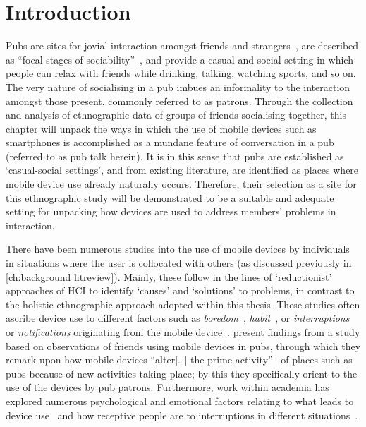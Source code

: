 \section{Introduction}\label{sec:empirical pub intro}
\begin{revisedsubmission}
Pubs are sites for jovial interaction amongst friends and strangers~\citep{Fox1996}, are described as ``focal stages of sociability''~\citep[p. 25]{Torronen2005}, and provide a casual and social setting in which people can relax with friends while drinking, talking, watching sports, and so on.
The very nature of socialising in a pub imbues an informality to the interaction amongst those present, commonly referred to as patrons.
Through the collection and analysis of ethnographic data of groups of friends socialising together, this chapter will unpack the ways in which the use of mobile devices such as smartphones is accomplished as a mundane feature of conversation in a pub (referred to as pub talk herein).
It is in this sense that pubs are established as `casual-social settings', and from existing literature, are identified as places where mobile device use already naturally occurs.
Therefore, their selection as a site for this ethnographic study will be demonstrated to be a suitable and adequate setting for unpacking how devices are used to address members' problems in interaction.

There have been numerous studies into the use of mobile devices by individuals in situations where the user is collocated with others (as discussed previously in \autoref{ch:background litreview}).
Mainly, these follow in the lines of `reductionist' approaches of \ac{HCI} to identify `causes' and `solutions' to problems, in contrast to the holistic ethnographic approach adopted within this thesis.
These studies often ascribe device use to different factors such as \textit{boredom}~\citep{Pielot2015}, \textit{habit}~\citep{Oulasvirta2011}, or \textit{interruptions} or \textit{notifications} originating from the mobile device~\citep{Park2017}.
\citet{Su2015} present findings from a study based on observations of friends using mobile devices in pubs, through which they remark upon how mobile devices ``alter[\ldots] the prime activity''~\citep[p. 1659]{Su2015} of places such as pubs because of new activities taking place; by this they specifically orient to the use of the devices by pub patrons.
Furthermore, work within academia has explored numerous psychological and emotional factors relating to what leads to device use~\citep{Kushlev2016} and how receptive people are to interruptions in different situations~\citep{Fischer2010, Mehrotra2016}.


\end{revisedsubmission}
